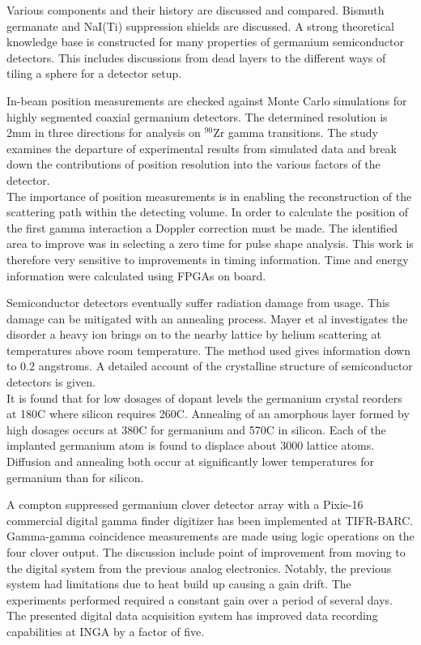 \documentclass[12pt]{article}
\begin{document}
\begin{doublespacing}
Various components and their history are discussed and compared.
Bismuth germanate and NaI(Ti) suppression shields are discussed.
A strong theoretical knowledge base is constructed for many properties of germanium semiconductor detectors.
This includes discussions from dead layers to the different ways of tiling a sphere for a detector setup.


\citep{Descovich2005535}
In-beam position measurements are checked against Monte Carlo simulations for highly segmented coaxial germanium detectors.
The determined resolution is 2mm in three directions for analysis on $^{90}\mbox{Zr}$ gamma transitions.
The study examines the departure of experimental results from simulated data and break down the contributions of position resolution into the various factors of the detector.
\\

The importance of position measurements is in enabling the reconstruction of the scattering path within the detecting volume.
In order to calculate the position of the first gamma interaction a Doppler correction must be made.
The identified area to improve was in selecting a zero time for pulse shape analysis.
This work is therefore very sensitive to improvements in timing information.
Time and energy information were calculated using FPGAs on board.


\citep{Mayer}
Semiconductor detectors eventually suffer radiation damage from usage.
This damage can be mitigated with an annealing process.
Mayer et al investigates the disorder a heavy ion brings on to the nearby lattice by helium scattering at temperatures above room temperature.
The method used gives information down to 0.2 angstroms.
A detailed account of the crystalline structure of semiconductor detectors is given.
\\

It is found that for low dosages of dopant levels the germanium crystal reorders at 180C where silicon requires 260C.
Annealing of an amorphous layer formed by high dosages occurs at 380C for germanium and 570C in silicon.
Each of the implanted germanium atom is found to displace about 3000 lattice atoms.
Diffusion and annealing both occur at significantly lower temperatures for germanium than for silicon.

\citep{Palit201290}
A compton suppressed germanium clover detector array with a Pixie-16 commercial digital gamma finder digitizer has been implemented at TIFR-BARC.
Gamma-gamma coincidence measurements are made using logic operations on the four clover output.
The discussion include point of improvement from moving to the digital system from the previous analog electronics.
Notably, the previous system had limitations due to heat build up causing a gain drift.
The experiments performed required a constant gain over a period of several days.
The presented digital data acquisition system has improved data recording capabilities at INGA by a factor of five.


\end{doublespacing}
\end{document}
